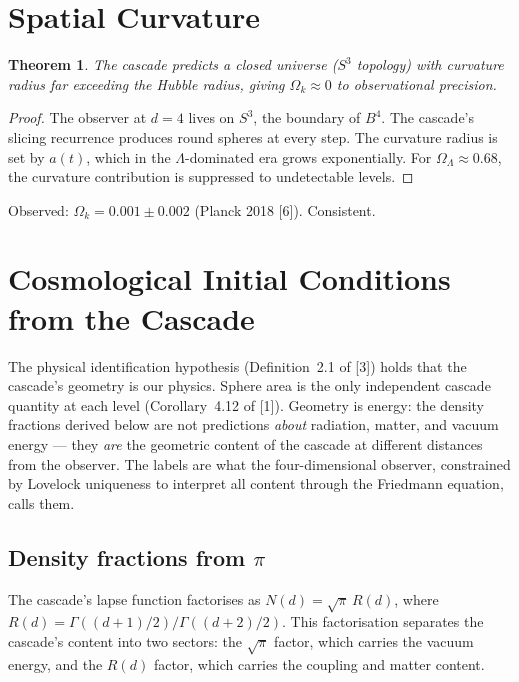 \documentclass[12pt,a4paper]{article}
\newtheorem{theorem}{Theorem}[section]
\begin{document}
\section{Spatial Curvature}

\begin{theorem}
The cascade predicts a closed universe ($S^3$ topology) with curvature radius far
exceeding the Hubble radius, giving $\Omega_k \approx 0$ to observational precision.
\end{theorem}

\begin{proof}
The observer at $d = 4$ lives on $S^3$, the boundary of $B^4$. The cascade's slicing
recurrence produces round spheres at every step. The curvature radius is set by $a(t)$,
which in the $\Lambda$-dominated era grows exponentially. For $\Omega_\Lambda \approx 0.68$, the curvature
contribution is suppressed to undetectable levels.
\end{proof}

Observed: $\Omega_k = 0.001 \pm 0.002$ (Planck 2018 [6]). Consistent.

\section{Cosmological Initial Conditions from the Cascade}

The physical identification hypothesis (Definition~2.1 of [3]) holds that the cascade's
geometry is our physics. Sphere area is the only independent cascade quantity at each
level (Corollary~4.12 of [1]). Geometry is energy: the density fractions derived below
are not predictions \emph{about} radiation, matter, and vacuum energy --- they \emph{are}
the geometric content of the cascade at different distances from the observer. The labels
are what the four-dimensional observer, constrained by Lovelock uniqueness to interpret
all content through the Friedmann equation, calls them.

\subsection{Density fractions from $\pi$}

The cascade's lapse function factorises as $N(d) = \sqrt{\pi}\,R(d)$, where
$R(d) = \Gamma((d+1)/2)/\Gamma((d+2)/2)$. This factorisation separates the cascade's content
into two sectors: the $\sqrt{\pi}$ factor, which carries the vacuum energy, and the $R(d)$
factor, which carries the coupling and matter content.
\end{document}
